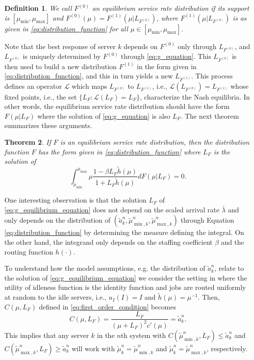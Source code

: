 \documentclass[a4paper,11pt,twoside]{article}
\numberwithin{equation}{section}
\numberwithin{figure}{section}
\theoremstyle{plain}
\newtheorem{theorem}{Theorem}[section]
\newtheorem{definition}[theorem]{Definition}
\newcommand{\cL}{\mathcal{L}}
\newcommand{\1}{\mathbbm{1}}
\begin{document}
\begin{definition}
We call $F^{(0)}$ an \textit{equilibrium service rate distribution} if its support is $[\mu_{\min}, \mu_{\max}]$ and  $F^{(0)}(\mu)=F^{(1)}(\mu| L_{F^{(0)}})$, where $F^{(1)}(\mu| L_{F^{(0)}})$ is as given in \eqref{eq:distribution_function} for all $\mu\in[\mu_{\min}, \mu_{\max}]$.  
\end{definition}
Note that the best response of server $k$ depends on $F^{(0)}$ only through $L_{F^{(0)}}$, and $L_{F^{(0)}}$ is uniquely determined by $F^{(0)}$ through \eqref{eq:g_equation}. This $L_{F^{(0)}}$ is then used to build a new distribution $F^{(1)}$ in the form given in \eqref{eq:distribution_function}, and this in turn yields a new $L_{F^{(1)}}$. This process defines an operator $\cL$ which maps $L_{F^{(0)}}$ to $L_{F^{(1)}}$, i.e., $\cL(L_{F^{(0)}})=L_{F^{(1)}}$ whose fixed points, i.e., the set $\{L_F:\cL(L_F)=L_F\}$, characterize the Nash equilibria. In other words, the equilibrium service rate distribution should have the form $F(\mu| L_F)$ where the solution of \eqref{eq:g_equation} is also $L_F$. 
The next theorem summarizes these arguments.
\begin{theorem}\label{thm:fixed_point_equation}
  If $F$ is an equilibrium service rate distribution, then the distribution function $F$ has the form given in \eqref{eq:distribution_function} where $L_F$ is the solution of 
  \begin{equation}
       \int_{\mu_{\min}}^{\mu_{\max}}\mu\frac{1-\beta L_F\tilde{h}(\mu)}{1+L_F\tilde{h}(\mu)}dF(\mu|L_F)=0.\label{eq:g_equilibrium_equation}
  \end{equation}
\end{theorem}

One interesting observation is that the solution $L_F$ of \eqref{eq:g_equilibrium_equation} does not depend on the scaled arrival rate $\bar{\lambda}$ and only depends on the distribution of $(\tilde{a}_k^n, \tilde{\mu}_{\min,k}^n, \tilde{\mu}_{\max,k}^n)$ through Equation \eqref{eq:distribution_function} by determining the measure defining the integral. On the other hand, the integrand only depends on the staffing coefficient  $\beta$ and the routing function $h(\cdot)$. 

To understand how the model assumptions, e.g. the distribution of $\tilde{a}_k^n$, relate to the solution of \eqref{eq:g_equilibrium_equation} we consider the setting in \cite{Gopalakrishnan_etal2016} where the utility of idleness function is the identity function and jobs are routed uniformly at random to the idle servers, i.e., $u_I(I) = I$ and $\tilde{h}(\mu)=\mu^{-1}$. Then, $C(\mu,L_{F})$ defined in \eqref{eq:first_order_condition} becomes 
\begin{equation*}
C(\mu,L_F) = \frac{L_F}{(\mu +L_F)^2c'(\mu)}=\tilde{a}_k^n. 
\end{equation*}
This implies that any server $k$ in the $n$th system with $C(\tilde{\mu}_{\min,k}^n, L_F)\leq \tilde{a}_k^n$ and $C(\tilde{\mu}_{\max,k}^n, L_F)\geq \tilde{a}_k^n$ will work with $\tilde{\mu}_k^n = \tilde{\mu}_{\min,k}^n$ and $\tilde{\mu}_k^n = \tilde{\mu}_{\max,k}^n$, respectively.
\end{document}

